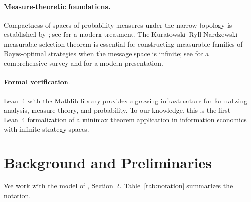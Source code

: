 \documentclass[11pt,a4paper]{article}
\theoremstyle{definition}
\begin{document}
\paragraph{Measure-theoretic foundations.}
Compactness of spaces of probability measures under the narrow topology is established by \citet{prokhorov1956convergence}; see \citet{billingsley1999convergence} for a modern treatment.
The Kuratowski--Ryll-Nardzewski measurable selection theorem \citep{kuratowski1965general} is essential for constructing measurable families of Bayes-optimal strategies when the message space is infinite; see \citet{wagner1977survey} for a comprehensive survey and \citet{bogachev2007measure} for a modern presentation.

\paragraph{Formal verification.}
Lean~4 \citep{lean4} with the Mathlib library \citep{mathlib4} provides a growing infrastructure for formalizing analysis, measure theory, and probability.
To our knowledge, this is the first Lean~4 formalization of a minimax theorem application in information economics with infinite strategy spaces.

\section{Background and Preliminaries}
\label{sec:background}

We work with the model of \citet{dworczak2026robust}, Section~2.
Table~\ref{tab:notation} summarizes the notation.
\end{document}
